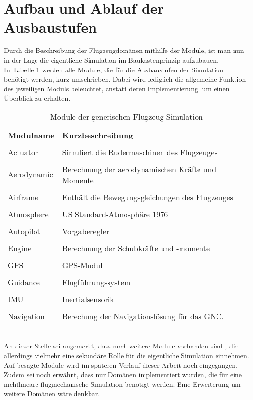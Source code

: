 \section{Aufbau und Ablauf der Ausbaustufen}
\label{sec:Ausbaustufen}
Durch die Beschreibung der Flugzeugdomänen mithilfe der Module, ist man nun in der Lage die eigentliche Simulation im Baukastenprinzip aufzubauen.\\ In Tabelle \ref{tab:Modulbeschreibungen} werden alle Module, die für die Ausbaustufen der Simulation benötigt werden, kurz umschrieben. Dabei wird lediglich die allgemeine Funktion des jeweiligen Moduls beleuchtet, anstatt deren Implementierung, um einen Überblick zu erhalten. \\
\begin{table}[h]
	\centering	\begin{tabular}{l p{9cm}}
		\textbf{Modulname} & \textbf{Kurzbeschreibung}\\\\
		Actuator	& Simuliert die Rudermaschinen des Flugzeuges\\\\
		Aerodynamic & Berechnung der aerodynamischen Kräfte und Momente\\\\
		Airframe & Enthält die Bewegungsgleichungen des Flugzeuges\\\\
		Atmosphere & US Standard-Atmosphäre 1976\\\\
		Autopilot & Vorgaberegler\\\\
		Engine & Berechnung der Schubkräfte und -momente\\\\
		GPS & GPS-Modul \\\\
		Guidance & Flugführungssystem\\\\
		IMU & Inertialsensorik\\\\
		Navigation &  Berechung der Navigationslösung für das GNC.
	\end{tabular}
	\caption{Module der generischen Flugzeug-Simulation}
	\label{tab:Modulbeschreibungen}
\end{table}\\
An dieser Stelle sei angemerkt, dass noch weitere Module vorhanden sind , die allerdings vielmehr eine sekundäre Rolle für die eigentliche Simulation einnehmen. Auf besagte Module wird im späteren Verlauf dieser Arbeit noch eingegangen. Zudem sei noch erwähnt, dass nur Domänen implementiert wurden, die für eine nichtlineare flugmechanische Simulation benötigt werden. Eine Erweiterung um weitere Domänen wäre denkbar. \\
